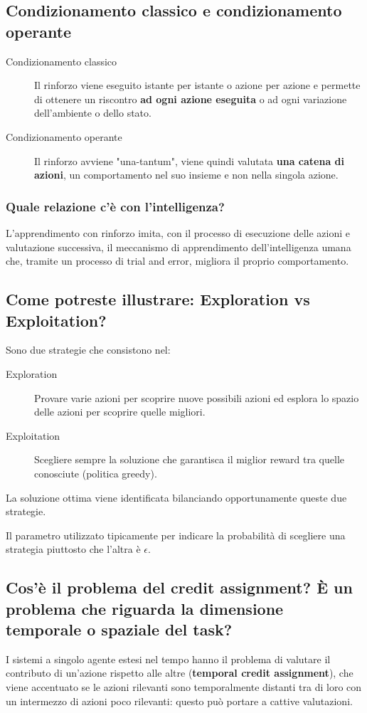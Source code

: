 \documentclass[\main/main.tex]{subfiles}
\begin{document}
\subsection{Condizionamento classico e condizionamento operante}
\begin{description}
  \item[Condizionamento classico] Il rinforzo viene eseguito istante per istante o azione per azione e permette di ottenere un riscontro \textbf{ad ogni azione eseguita} o ad ogni variazione dell'ambiente o dello stato.
  \item[Condizionamento operante] Il rinforzo avviene "una-tantum", viene quindi valutata \textbf{una catena di azioni}, un comportamento nel suo insieme e non nella singola azione.
\end{description}

\subsubsection{Quale relazione c'è con l'intelligenza?}
L'apprendimento con rinforzo imita, con il processo di esecuzione delle azioni e valutazione successiva, il meccanismo di apprendimento dell'intelligenza umana che, tramite un processo di trial and error, migliora il proprio comportamento.

\subsection{Come potreste illustrare: Exploration vs Exploitation?}
Sono due strategie che consistono nel:
\begin{description}
  \item[Exploration] Provare varie azioni per scoprire nuove possibili azioni ed esplora lo spazio delle azioni per scoprire quelle migliori.
  \item[Exploitation] Scegliere sempre la soluzione che garantisca il miglior reward tra quelle conosciute (politica greedy).
\end{description}
La soluzione ottima viene identificata bilanciando opportunamente queste due strategie.

Il parametro utilizzato tipicamente per indicare la probabilità di scegliere una strategia piuttosto che l'altra è $\epsilon$.

\subsection{Cos'è il problema del credit assignment? È un problema che riguarda la dimensione temporale o spaziale del task?}
I sistemi a singolo agente estesi nel tempo hanno il problema di valutare il contributo di un'azione rispetto alle altre (\textbf{temporal credit assignment}), che viene accentuato se le azioni rilevanti sono temporalmente distanti tra di loro con un intermezzo di azioni poco rilevanti: questo può portare a cattive valutazioni.
\end{document}
